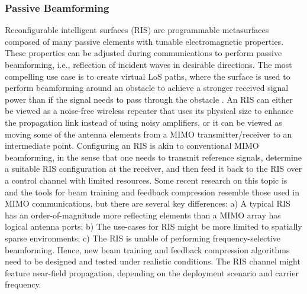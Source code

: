 \documentclass[lettersize,journal]{IEEEtran}
\begin{document}
\subsubsection{Passive Beamforming}
Reconfigurable intelligent surfaces (RIS) are programmable metasurfaces composed of many passive elements with tunable electromagnetic properties\cite{9721205}. These properties can be adjusted during communications to perform passive beamforming, i.e., reflection of incident waves in desirable directions. The most compelling use case is to create virtual LoS paths, where the surface is used to perform beamforming around an obstacle to achieve a stronger received signal power than if the signal needs to pass through the obstacle \cite{IRS1,risbook2,risbook3}. An RIS can either be viewed as a noise-free wireless repeater that uses its physical size to enhance the propagation link instead of using noisy amplifiers, or it can be viewed as moving some of the antenna elements from a MIMO transmitter/receiver to an intermediate point.
Configuring an RIS is akin to conventional MIMO beamforming, in the sense that one needs to transmit reference signals, determine a suitable RIS configuration at the receiver, and then feed it back to the RIS over a control channel with limited resources. Some recent research on this topic is \cite{10600711, joseph2024TWC,Enqvist2025a} and the tools for beam training and feedback compression resemble those used in MIMO communications, but there are several key differences: a) A typical RIS has an order-of-magnitude more reflecting elements than a MIMO array has logical antenna ports; b) The use-cases for RIS might be more limited to spatially sparse environments; c) The RIS is unable of performing frequency-selective beamforming.  Hence, new beam training and feedback compression algorithms need to be designed \cite{9200578,10236999} and tested under realistic conditions. The RIS channel might feature near-field propagation, depending on the deployment scenario and carrier frequency.

\end{document}
